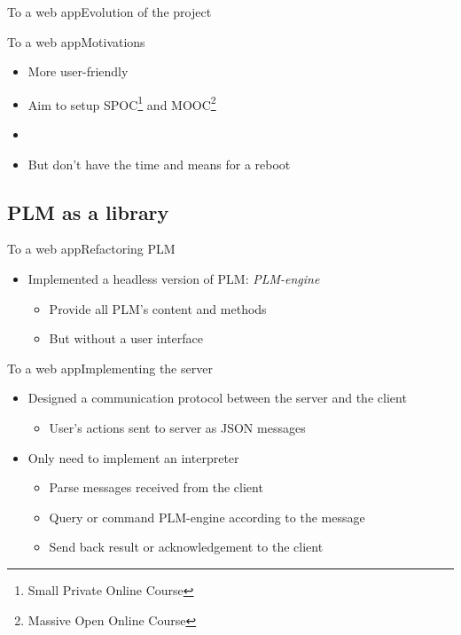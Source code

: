 \documentclass{beamer}
\begin{document}
\begin{frame}{To a web app}{Evolution of the project}
\begin{center}
  \end{center}
\end{frame}

\begin{frame}{To a web app}{Motivations}
  \begin{itemize}
  \item {
    More user-friendly
  }
  \item {
    Aim to setup SPOC\footnote{Small Private Online Course} and MOOC\footnote{Massive Open Online Course}
  }
  \item[~]
  \item {
    But don't have the time and means for a reboot
  }
  \end{itemize}
\end{frame}

\subsection{PLM as a library}

\begin{frame}{To a web app}{Refactoring PLM}
  \begin{itemize}
  \item {
    Implemented a headless version of PLM: \emph{PLM-engine}
    \begin{itemize}
    \item Provide all PLM's content and methods
    \item But without a user interface
    \end{itemize}
  }
  \end{itemize}
\end{frame}

\begin{frame}{To a web app}{Implementing the server}
  \begin{itemize}
  \item {
    Designed a communication protocol between the server and the client
    \begin{itemize}
    \item User's actions sent to server as JSON messages
    \end{itemize}
  }
  \item {
    Only need to implement an interpreter
    \begin{itemize}
    \item Parse messages received from the client
    \item Query or command PLM-engine according to the message
    \item Send back result or acknowledgement to the client
    \end{itemize}
  }
  \end{itemize}
\end{frame}
\end{document}
